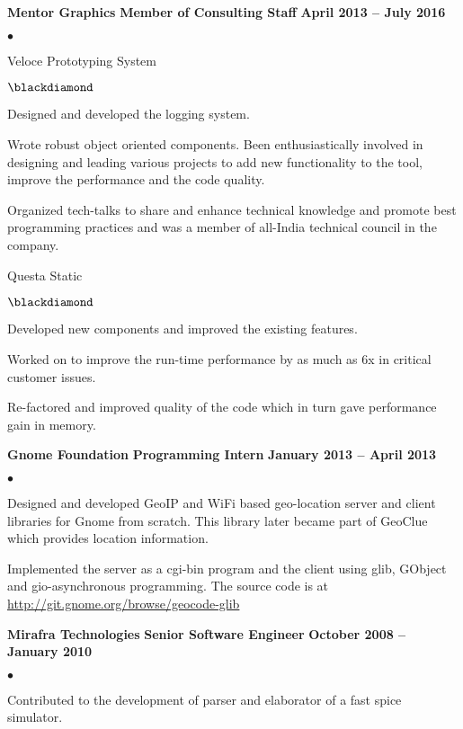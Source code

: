\documentclass[margin,line]{res}
\newenvironment{list1}{
  \begin{list}{$\bullet$}{%
      \setlength{\itemsep}{0in}
      \setlength{\parsep}{0in} \setlength{\parskip}{0in}
      \setlength{\topsep}{0in} \setlength{\partopsep}{0in}
      \setlength{\leftmargin}{0.17in}}}{\end{list}}
\newenvironment{list2}{
  \begin{list}{$\blackdiamond$}{%
      \setlength{\itemsep}{0in}
      \setlength{\parsep}{0in} \setlength{\parskip}{0in}
      \setlength{\topsep}{0in} \setlength{\partopsep}{0in}
      \setlength{\leftmargin}{0.2in}}}{\end{list}}
\begin{document}
\begin{resume}
{\bf   Mentor Graphics}
\hfill {\bf Member of Consulting Staff}
\hfill{\bf April 2013 -- July 2016}
\vspace{.05in}
\begin{list1} %
	\item Veloce Prototyping System
	\begin{list2}
		\item Designed and developed the logging system.
		\item Wrote robust object oriented components. Been enthusiastically involved in designing and leading various projects to add new functionality to the tool, improve the performance and the code quality.
		\item Organized tech-talks to share and enhance technical knowledge and promote best programming practices and was a member of all-India technical council in the company.
	\end{list2}
	\item Questa Static
	\begin{list2}
		\item Developed new components and improved the existing features.
		\item Worked on to improve the run-time performance by as much as 6x in critical customer issues.
		\item Re-factored and improved quality of the code which in turn gave performance gain in memory.
	\end{list2}
\end{list1}
{\bf   Gnome Foundation}
\hfill {\bf Programming Intern}
\hfill{\bf January 2013 -- April 2013}
\vspace{.05in}
\begin{list1} %
\item Designed and developed GeoIP and WiFi based geo-location server and client libraries for Gnome from scratch. This library later became part of GeoClue which provides location information.
\item Implemented the server as a cgi-bin program and the client using glib, GObject and gio-asynchronous programming. The source code is at \url {http://git.gnome.org/browse/geocode-glib}
\end{list1}
{\bf   Mirafra Technologies}
\hfill {\bf Senior Software Engineer}
\hfill{\bf October 2008 -- January 2010}
\vspace{.05in}
\begin{list1} %
\item Contributed to the development of parser and elaborator of a fast spice simulator.

\end{list1}
\end{resume}
\end{document}
